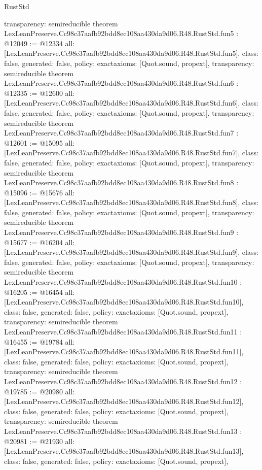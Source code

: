 \begin{lexlean}{RustStd}
\begin{coremodule}
{  transparency: semireducible
}
theorem LexLeanPreserve.Cc98c37aafb92bdd8ec108aa430da9d06.R48.RustStd.fun5 : @12049 := @12334 {
  all: [LexLeanPreserve.Cc98c37aafb92bdd8ec108aa430da9d06.R48.RustStd.fun5],
  class: false,
  generated: false,
  policy: exact{axioms: [Quot.sound, propext]},
  transparency: semireducible
}
theorem LexLeanPreserve.Cc98c37aafb92bdd8ec108aa430da9d06.R48.RustStd.fun6 : @12335 := @12600 {
  all: [LexLeanPreserve.Cc98c37aafb92bdd8ec108aa430da9d06.R48.RustStd.fun6],
  class: false,
  generated: false,
  policy: exact{axioms: [Quot.sound, propext]},
  transparency: semireducible
}
theorem LexLeanPreserve.Cc98c37aafb92bdd8ec108aa430da9d06.R48.RustStd.fun7 : @12601 := @15095 {
  all: [LexLeanPreserve.Cc98c37aafb92bdd8ec108aa430da9d06.R48.RustStd.fun7],
  class: false,
  generated: false,
  policy: exact{axioms: [Quot.sound, propext]},
  transparency: semireducible
}
theorem LexLeanPreserve.Cc98c37aafb92bdd8ec108aa430da9d06.R48.RustStd.fun8 : @15096 := @15676 {
  all: [LexLeanPreserve.Cc98c37aafb92bdd8ec108aa430da9d06.R48.RustStd.fun8],
  class: false,
  generated: false,
  policy: exact{axioms: [Quot.sound, propext]},
  transparency: semireducible
}
theorem LexLeanPreserve.Cc98c37aafb92bdd8ec108aa430da9d06.R48.RustStd.fun9 : @15677 := @16204 {
  all: [LexLeanPreserve.Cc98c37aafb92bdd8ec108aa430da9d06.R48.RustStd.fun9],
  class: false,
  generated: false,
  policy: exact{axioms: [Quot.sound, propext]},
  transparency: semireducible
}
theorem LexLeanPreserve.Cc98c37aafb92bdd8ec108aa430da9d06.R48.RustStd.fun10 : @16205 := @16454 {
  all: [LexLeanPreserve.Cc98c37aafb92bdd8ec108aa430da9d06.R48.RustStd.fun10],
  class: false,
  generated: false,
  policy: exact{axioms: [Quot.sound, propext]},
  transparency: semireducible
}
theorem LexLeanPreserve.Cc98c37aafb92bdd8ec108aa430da9d06.R48.RustStd.fun11 : @16455 := @19784 {
  all: [LexLeanPreserve.Cc98c37aafb92bdd8ec108aa430da9d06.R48.RustStd.fun11],
  class: false,
  generated: false,
  policy: exact{axioms: [Quot.sound, propext]},
  transparency: semireducible
}
theorem LexLeanPreserve.Cc98c37aafb92bdd8ec108aa430da9d06.R48.RustStd.fun12 : @19785 := @20980 {
  all: [LexLeanPreserve.Cc98c37aafb92bdd8ec108aa430da9d06.R48.RustStd.fun12],
  class: false,
  generated: false,
  policy: exact{axioms: [Quot.sound, propext]},
  transparency: semireducible
}
theorem LexLeanPreserve.Cc98c37aafb92bdd8ec108aa430da9d06.R48.RustStd.fun13 : @20981 := @21930 {
  all: [LexLeanPreserve.Cc98c37aafb92bdd8ec108aa430da9d06.R48.RustStd.fun13],
  class: false,
  generated: false,
  policy: exact{axioms: [Quot.sound, propext]},
}
\end{coremodule}
\end{lexlean}
